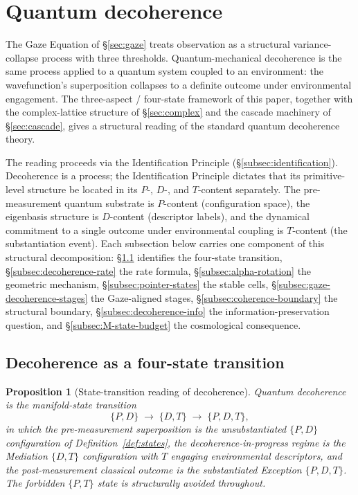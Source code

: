 \documentclass[11pt,a4paper]{article}
\newtheorem{proposition}[theorem]{Proposition}
\theoremstyle{definition}
\theoremstyle{remark}
\begin{document}
\section{Quantum decoherence}\label{sec:decoherence}

The Gaze Equation of \S\ref{sec:gaze} treats observation as a structural variance-collapse process with three thresholds. Quantum-mechanical decoherence is the same process applied to a quantum system coupled to an environment: the wavefunction's superposition collapses to a definite outcome under environmental engagement. The three-aspect / four-state framework of this paper, together with the complex-lattice structure of \S\ref{sec:complex} and the cascade machinery of \S\ref{sec:cascade}, gives a structural reading of the standard quantum decoherence theory.

The reading proceeds via the Identification Principle (\S\ref{subsec:identification}). Decoherence is a process; the Identification Principle dictates that its primitive-level structure be located in its $P$-, $D$-, and $T$-content separately. The pre-measurement quantum substrate is $P$-content (configuration space), the eigenbasis structure is $D$-content (descriptor labels), and the dynamical commitment to a single outcome under environmental coupling is $T$-content (the substantiation event). Each subsection below carries one component of this structural decomposition: \S\ref{subsec:decoherence-states} identifies the four-state transition, \S\ref{subsec:decoherence-rate} the rate formula, \S\ref{subsec:alpha-rotation} the geometric mechanism, \S\ref{subsec:pointer-states} the stable cells, \S\ref{subsec:gaze-decoherence-stages} the Gaze-aligned stages, \S\ref{subsec:coherence-boundary} the structural boundary, \S\ref{subsec:decoherence-info} the information-preservation question, and \S\ref{subsec:M-state-budget} the cosmological consequence.

\subsection{Decoherence as a four-state transition}\label{subsec:decoherence-states}

\begin{proposition}[State-transition reading of decoherence]\label{prop:decoherence-transition}
Quantum decoherence is the manifold-state transition
\[
\{P,D\} \;\longrightarrow\; \{D,T\} \;\longrightarrow\; \{P,D,T\},
\]
in which the pre-measurement superposition is the unsubstantiated $\{P,D\}$ configuration of Definition~\ref{def:states}, the decoherence-in-progress regime is the Mediation $\{D,T\}$ configuration with $T$ engaging environmental descriptors, and the post-measurement classical outcome is the substantiated Exception $\{P,D,T\}$. The forbidden $\{P,T\}$ state is structurally avoided throughout.
\end{proposition}
\end{document}
